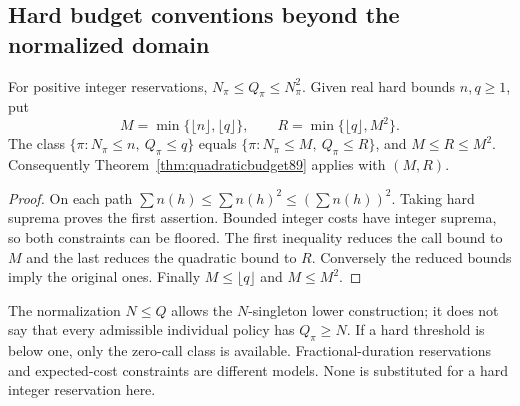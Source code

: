 \subsection{Hard budget conventions beyond the normalized domain}
\begin{proposition}\label{prop:budgetdomain90}
For positive integer reservations, $N_\pi\le Q_\pi\le N_\pi^2$.
Given real hard bounds $n,q\ge1$, put
\[
 M=\min\{\lfloor n\rfloor,\lfloor q\rfloor\},\qquad
 R=\min\{\lfloor q\rfloor,M^2\}.
\]
The class $\{\pi:N_\pi\le n,\ Q_\pi\le q\}$ equals
$\{\pi:N_\pi\le M,\ Q_\pi\le R\}$, and $M\le R\le M^2$.
Consequently Theorem~\ref{thm:quadraticbudget89} applies with $(M,R)$.
\end{proposition}
\begin{proof}
On each path $\sum n(h)\le\sum n(h)^2\le(\sum n(h))^2$.
Taking hard suprema proves the first assertion.  Bounded integer costs
have integer suprema, so both constraints can be floored.  The first
inequality reduces the call bound to $M$ and the last reduces the
quadratic bound to $R$.  Conversely the reduced bounds imply the original
ones.  Finally $M\le\lfloor q\rfloor$ and $M\le M^2$.
\end{proof}
The normalization $N\le Q$ allows the $N$-singleton lower construction;
it does not say that every admissible individual policy has $Q_\pi\ge N$.
If a hard threshold is below one, only the zero-call class is available.
Fractional-duration reservations and expected-cost constraints are
different models.  None is substituted for a hard integer reservation here.
